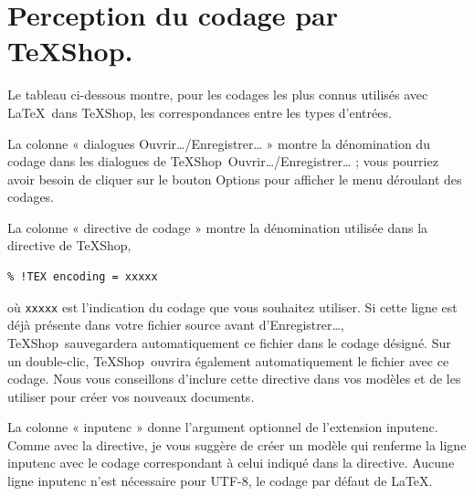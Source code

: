 \documentclass[11pt,french]{article}
\newcommand{\TS}{\textsf{\TeX Shop}}
\newcommand{\acr}[1]{\textsf{#1}}
\newcommand{\cmd}[1]{\textsf{#1}}
\begin{document}
\section{Perception du codage par \TS.}\label{thetable}

Le tableau ci-dessous montre, pour les codages les plus connus utilisés avec \LaTeX\ dans \TS, les correspondances entre les types d'entrées.

La colonne « dialogues Ouvrir…/Enregistrer… » montre la dénomination du codage dans les dialogues de \TS\ Ouvrir…/Enregistrer… ; vous pourriez avoir besoin de cliquer sur le bouton \cmd{Options} pour afficher le menu déroulant des codages. 

La colonne « directive de codage » montre la dénomination utilisée dans la directive de \TS,
\begin{verbatim}
% !TEX encoding = xxxxx
\end{verbatim}
où \texttt{xxxxx} est l'indication du codage que vous souhaitez utiliser. Si cette ligne est déjà présente dans votre fichier source avant d'\cmd{Enregistrer…}, \TS\ sauvegardera automatiquement ce fichier dans le codage désigné. Sur un \cmd{double-clic}, \TS\ ouvrira également automatiquement le fichier avec ce codage. Nous vous conseillons d'inclure cette directive dans vos modèles et de les utiliser pour créer vos nouveaux documents.

La colonne « inputenc » donne l'argument optionnel de l'extension inputenc. Comme avec la directive, je vous suggère de créer un modèle qui renferme la ligne inputenc avec le codage correspondant à celui indiqué dans la directive. Aucune ligne inputenc n'est nécessaire pour \acr{UTF-8}, le codage par défaut de \LaTeX.
\end{document}
